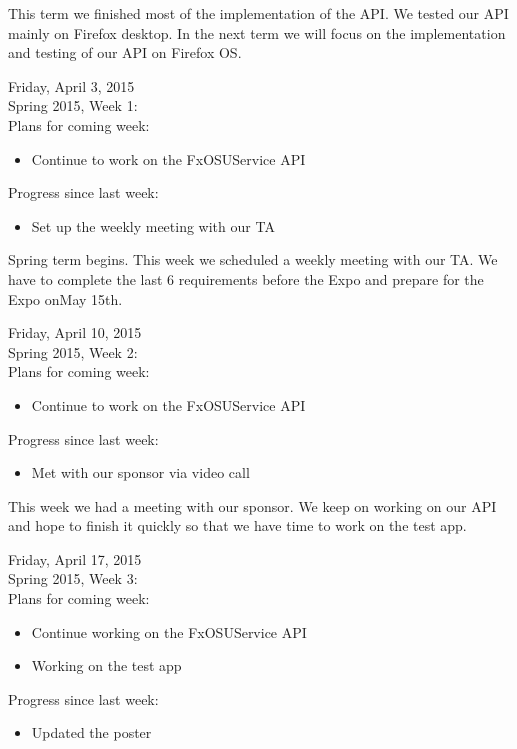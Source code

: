 This term we finished most of the implementation of the API.  We tested our API mainly on Firefox desktop. In the next term we will focus on the implementation and testing of our API on Firefox OS.

Friday, April 3, 2015 \\
Spring 2015, Week 1: \\

Plans for coming week:
\begin{itemize}
\item Continue to work on the FxOSUService API
\end{itemize}

Progress since last week:
\begin{itemize}
\item Set up the weekly meeting with our TA
\end{itemize}

Spring term begins. This week we scheduled a weekly meeting with our TA. We have to complete the last 6 requirements before the Expo and prepare for the Expo onMay 15th. 

Friday, April 10, 2015 \\
Spring 2015, Week 2: \\

Plans for coming week:
\begin{itemize}
\item Continue to work on the FxOSUService API
\end{itemize}

Progress since last week:
\begin{itemize}
\item Met with our sponsor via video call
\end{itemize}

This week we had a meeting with our sponsor. We keep on working on our API and hope to finish it quickly so that we have time to work on the test app.

Friday, April 17, 2015 \\
Spring 2015, Week 3: \\

Plans for coming week:
\begin{itemize}
\item Continue working on the FxOSUService API
\item Working on the test app
\end{itemize}

Progress since last week:
\begin{itemize}
\item Updated the poster
\end{itemize}

